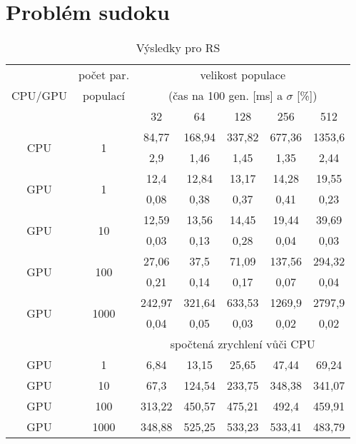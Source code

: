 \section{Problém sudoku}
\begin{table}[h]
    \begin{center}
    \begin{tabular}{ccccccc}
      \toprule
      \midrule
      \multirow{3}{*}{CPU/GPU} & počet par. & \multicolumn{5}{c}{velikost populace} \\
      & populací & \multicolumn{5}{c}{(čas na 100 gen. [ms] a $\sigma$ [\%])} \\
      & & 32 & 64 & 128 & 256 & 512 \\
      \midrule
      \multirow{2}{*}{CPU} & \multirow{2}{*}{1}
&84,77&168,94&337,82&677,36&1353,6\\
&&2,9&1,46&1,45&1,35&2,44\vspace{1.5mm}\\
\multirow{2}{*}{GPU} & \multirow{2}{*}{1}
&12,4&12,84&13,17&14,28&19,55\\
&&0,08&0,38&0,37&0,41&0,23\vspace{1.5mm}\\
\multirow{2}{*}{GPU} & \multirow{2}{*}{10}
&12,59&13,56&14,45&19,44&39,69\\
&&0,03&0,13&0,28&0,04&0,03\vspace{1.5mm}\\
\multirow{2}{*}{GPU} & \multirow{2}{*}{100}
&27,06&37,5&71,09&137,56&294,32\\
&&0,21&0,14&0,17&0,07&0,04\vspace{1.5mm}\\
\multirow{2}{*}{GPU} & \multirow{2}{*}{1000}
&242,97&321,64&633,53&1269,9&2797,9\\
&&0,04&0,05&0,03&0,02&0,02\\
\midrule
      & & \multicolumn{5}{c}{spočtená zrychlení vůči CPU} \\
\midrule
      GPU & 1
&6,84&13,15&25,65&47,44&69,24\\
GPU & 10
&67,3&124,54&233,75&348,38&341,07\\
GPU & 100
&313,22&450,57&475,21&492,4&459,91\\
GPU & 1000
&348,88&525,25&533,23&533,41&483,79\\
\midrule
      \bottomrule
    \end{tabular}
    \caption{Výsledky pro RS}
    \end{center}
\end{table}
\clearpage

